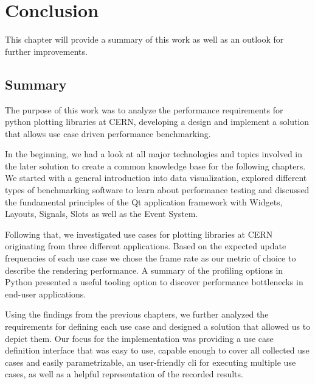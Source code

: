 

\chapter{Conclusion}
\label{ch:conclusion}

This chapter will provide a summary of this work as well as an outlook for
further improvements.

\section{Summary}
\label{sec:Conclusion:Summary}

The purpose of this work was to analyze the performance requirements for python
plotting libraries at CERN, developing a design and implement a solution that
allows use case driven performance benchmarking.

In the beginning, we had a look at all major technologies and topics involved in
the later solution to create a common knowledge base for the following chapters.
We started with a general introduction into data visualization, explored
different types of benchmarking software to learn about performance testing and
discussed the fundamental principles of the Qt application framework with
Widgets, Layouts, Signals, Slots as well as the Event System.

Following that, we investigated use cases for plotting libraries at CERN
originating from three different applications. Based on the expected update
frequencies of each use case we chose the frame rate as our metric of choice to
describe the rendering performance. A summary of the profiling options in
Python presented a useful tooling option to discover performance bottlenecks in
end-user applications.

Using the findings from the previous chapters, we further analyzed the
requirements for defining each use case and designed a solution that allowed us
to depict them. Our focus for the implementation was providing a use case
definition interface that was easy to use, capable enough to cover all
collected use cases and easily parametrizable, an user-friendly \gls{cli} for
executing multiple use cases, as well as a helpful representation of the
recorded results.

